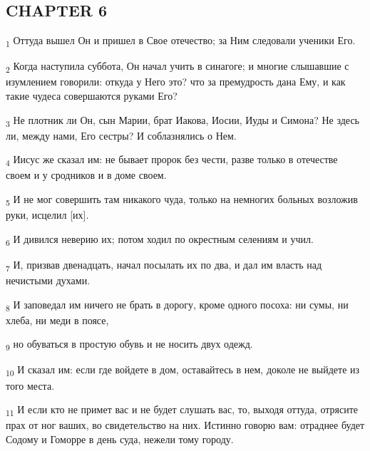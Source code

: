 \subsection{CHAPTER 6}
\begin{tcolorbox}
\textsubscript{1} Оттуда вышел Он и пришел в Свое отечество; за Ним следовали ученики Его.
\end{tcolorbox}
\begin{tcolorbox}
\textsubscript{2} Когда наступила суббота, Он начал учить в синагоге; и многие слышавшие с изумлением говорили: откуда у Него это? что за премудрость дана Ему, и как такие чудеса совершаются руками Его?
\end{tcolorbox}
\begin{tcolorbox}
\textsubscript{3} Не плотник ли Он, сын Марии, брат Иакова, Иосии, Иуды и Симона? Не здесь ли, между нами, Его сестры? И соблазнялись о Нем.
\end{tcolorbox}
\begin{tcolorbox}
\textsubscript{4} Иисус же сказал им: не бывает пророк без чести, разве только в отечестве своем и у сродников и в доме своем.
\end{tcolorbox}
\begin{tcolorbox}
\textsubscript{5} И не мог совершить там никакого чуда, только на немногих больных возложив руки, исцелил [их].
\end{tcolorbox}
\begin{tcolorbox}
\textsubscript{6} И дивился неверию их; потом ходил по окрестным селениям и учил.
\end{tcolorbox}
\begin{tcolorbox}
\textsubscript{7} И, призвав двенадцать, начал посылать их по два, и дал им власть над нечистыми духами.
\end{tcolorbox}
\begin{tcolorbox}
\textsubscript{8} И заповедал им ничего не брать в дорогу, кроме одного посоха: ни сумы, ни хлеба, ни меди в поясе,
\end{tcolorbox}
\begin{tcolorbox}
\textsubscript{9} но обуваться в простую обувь и не носить двух одежд.
\end{tcolorbox}
\begin{tcolorbox}
\textsubscript{10} И сказал им: если где войдете в дом, оставайтесь в нем, доколе не выйдете из того места.
\end{tcolorbox}
\begin{tcolorbox}
\textsubscript{11} И если кто не примет вас и не будет слушать вас, то, выходя оттуда, отрясите прах от ног ваших, во свидетельство на них. Истинно говорю вам: отраднее будет Содому и Гоморре в день суда, нежели тому городу.
\end{tcolorbox}

